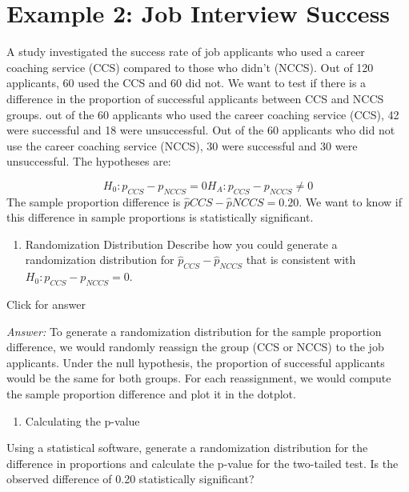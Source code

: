 \documentclass[
]{book}
\providecommand{\tightlist}{%
  \setlength{\itemsep}{0pt}\setlength{\parskip}{0pt}}
\begin{document}
\hypertarget{example-2-job-interview-success}{%
\section{Example 2: Job Interview Success}\label{example-2-job-interview-success}}

A study investigated the success rate of job applicants who used a career coaching service (CCS) compared to those who didn't (NCCS). Out of 120 applicants, 60 used the CCS and 60 did not. We want to test if there is a difference in the proportion of successful applicants between CCS and NCCS groups. out of the 60 applicants who used the career coaching service (CCS), 42 were successful and 18 were unsuccessful. Out of the 60 applicants who did not use the career coaching service (NCCS), 30 were successful and 30 were unsuccessful. The hypotheses are:

\[H_0: p_{C C S}-p_{N C C S}=0 H_A: p_{C C S}-p_{N C C S} \neq 0\]
The sample proportion difference is \(\hat{p}{CCS} - \hat{p}{NCCS} = 0.20\). We want to know if this difference in sample proportions is statistically significant.

\begin{enumerate}
\def\labelenumi{(\alph{enumi})}
\tightlist
\item
  Randomization Distribution
  Describe how you could generate a randomization distribution for \(\hat{p}_{CCS} - \hat{p}_{NCCS}\) that is consistent with \(H_0: p_{CCS} - p_{NCCS} = 0\).
\end{enumerate}

Click for answer

\emph{Answer:} To generate a randomization distribution for the sample proportion difference, we would randomly reassign the group (CCS or NCCS) to the job applicants. Under the null hypothesis, the proportion of successful applicants would be the same for both groups. For each reassignment, we would compute the sample proportion difference and plot it in the dotplot.

\begin{enumerate}
\def\labelenumi{(\alph{enumi})}
\setcounter{enumi}{1}
\tightlist
\item
  Calculating the p-value
\end{enumerate}

Using a statistical software, generate a randomization distribution for the difference in proportions and calculate the p-value for the two-tailed test. Is the observed difference of 0.20 statistically significant?
\end{document}
